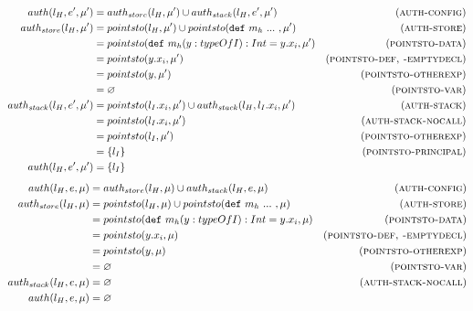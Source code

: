 \documentclass{llncs}
\newcommand{\keywadj}[1]{\mathtt{#1}}
\newcommand{\keyw}[1]{\keywadj{#1}~}
\begin{document}
\begin{align*}
auth(l_H, e', \mu') &= auth_{store}(l_H, \mu') \cup auth_{stack}(l_H, e', \mu') & (\textsc{auth-config})\\
auth_{store}(l_H, \mu') &= pointsto(l_H, \mu') \cup pointsto(\keyw{def} m_h~...~, \mu') & (\textsc{auth-store})\\
 &= pointsto(\keyw{def} m_h(y : typeOfI) : Int = y.x_i, \mu') & (\textsc{pointsto-data})\\
 &= pointsto(y.x_i, \mu') & (\textsc{pointsto-def, -emptydecl})\\
 &= pointsto(y, \mu') & (\textsc{pointsto-otherexp})\\
 &= \varnothing & (\textsc{pointsto-var})\\
auth_{stack}(l_H, e', \mu') &= pointsto(l_I.x_i, \mu') \cup auth_{stack}(l_H, l_I.x_i, \mu') & (\textsc{auth-stack})\\
 &= pointsto(l_I.x_i, \mu') & (\textsc{auth-stack-nocall})\\
 &= pointsto(l_I, \mu') & (\textsc{pointsto-otherexp})\\
 &= \{ l_I \} & (\textsc{pointsto-principal})\\
auth(l_H, e', \mu') &= \{ l_I \} &\\
\end{align*}
\begin{align*}
auth(l_H, e, \mu) &= auth_{store}(l_H, \mu) \cup auth_{stack}(l_H, e, \mu) & (\textsc{auth-config})\\
auth_{store}(l_H, \mu) &= pointsto(l_H, \mu) \cup pointsto(\keyw{def} m_h~...~, \mu) & (\textsc{auth-store})\\
 &= pointsto(\keyw{def} m_h(y : typeOfI) : Int = y.x_i, \mu) & (\textsc{pointsto-data})\\
 &= pointsto(y.x_i, \mu) & (\textsc{pointsto-def, -emptydecl})\\
 &= pointsto(y, \mu) & (\textsc{pointsto-otherexp})\\
 &= \varnothing & (\textsc{pointsto-var})\\
auth_{stack}(l_H, e, \mu) &= \varnothing & (\textsc{auth-stack-nocall})\\
auth(l_H, e, \mu) &=  \varnothing &\\
\end{align*}
\end{document}
